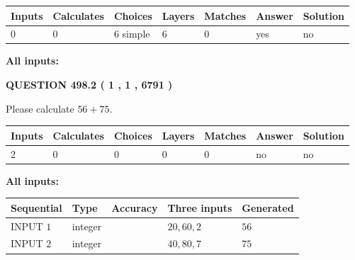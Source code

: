 \documentclass[12pt]{article}
\begin{document}
 
\noindent{}
 
 
   
   
   
   
\noindent\begin{tabular}{|l|l|l|l|l|l|l|}
 \hline
Inputs & Calculates & Choices & Layers & Matches & Answer & Solution \\ \hline
 0  & 
 0  & 
 6
  simple  
  & 
 6  & 
 0  & 
  yes & 
  no 
  \\ \hline
 \end{tabular}
   
   
   
   
\noindent{}
   
   
   
   
\noindent\vspace{0.1in}\hspace{-0.08in} {\textbf{\Large{All inputs: }}}
   
   
  
\vspace{0.2in}
  
{\textbf{\Large{QUESTION
498.2 
 ( 1 , 1 , 6791 )
}}}
  
  
 
Please calculate $ %
56 +  %
75 $.
 
 
   
   
   
   
\noindent\begin{tabular}{|l|l|l|l|l|l|l|}
 \hline
Inputs & Calculates & Choices & Layers & Matches & Answer & Solution \\ \hline
 2  & 
 0  & 
 0
  & 
 0  & 
 0  & 
  no & 
  no 
  \\ \hline
 \end{tabular}
   
   
   
   
\noindent{}
   
   
   
   
\noindent\vspace{0.1in}\hspace{-0.08in} {\textbf{\Large{All inputs: }}}
   
   
  
  
\noindent\begin{tabular}{|l|l|l|l|l|}
\hline
 Sequential & Type & Accuracy & Three inputs & Generated \\ 
\hline
 
 
  INPUT $  1 $ & integer &  & $
 20
 , 
 60
 , 
 2
 $ & $ 56 $ 
 \\  \hline  
 
 
  INPUT $  2 $ & integer &  & $
 40
 , 
 80
 , 
 7
 $ & $ 75 $ 
 \\  \hline  
 \end{tabular}
   
\end{document}
